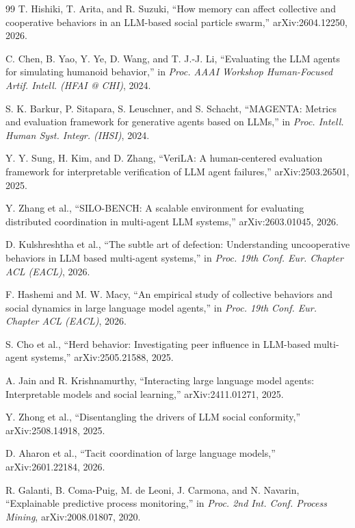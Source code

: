 \documentclass[11pt]{article}
\begin{document}
\begin{thebibliography}{99}
T. Hishiki, T. Arita, and R. Suzuki, ``How memory can affect collective and cooperative behaviors in an LLM-based social particle swarm,'' arXiv:2604.12250, 2026.

C. Chen, B. Yao, Y. Ye, D. Wang, and T. J.-J. Li, ``Evaluating the LLM agents for simulating humanoid behavior,'' in \emph{Proc. AAAI Workshop Human-Focused Artif. Intell. (HFAI @ CHI)}, 2024.

S. K. Barkur, P. Sitapara, S. Leuschner, and S. Schacht, ``MAGENTA: Metrics and evaluation framework for generative agents based on LLMs,'' in \emph{Proc. Intell. Human Syst. Integr. (IHSI)}, 2024.

Y. Y. Sung, H. Kim, and D. Zhang, ``VeriLA: A human-centered evaluation framework for interpretable verification of LLM agent failures,'' arXiv:2503.26501, 2025.

Y. Zhang et al., ``SILO-BENCH: A scalable environment for evaluating distributed coordination in multi-agent LLM systems,'' arXiv:2603.01045, 2026.

D. Kulshreshtha et al., ``The subtle art of defection: Understanding uncooperative behaviors in LLM based multi-agent systems,'' in \emph{Proc. 19th Conf. Eur. Chapter ACL (EACL)}, 2026.

F. Hashemi and M. W. Macy, ``An empirical study of collective behaviors and social dynamics in large language model agents,'' in \emph{Proc. 19th Conf. Eur. Chapter ACL (EACL)}, 2026.

S. Cho et al., ``Herd behavior: Investigating peer influence in LLM-based multi-agent systems,'' arXiv:2505.21588, 2025.

A. Jain and R. Krishnamurthy, ``Interacting large language model agents: Interpretable models and social learning,'' arXiv:2411.01271, 2025.

Y. Zhong et al., ``Disentangling the drivers of LLM social conformity,'' arXiv:2508.14918, 2025.

D. Aharon et al., ``Tacit coordination of large language models,'' arXiv:2601.22184, 2026.

R. Galanti, B. Coma-Puig, M. de Leoni, J. Carmona, and N. Navarin, ``Explainable predictive process monitoring,'' in \emph{Proc. 2nd Int. Conf. Process Mining}, arXiv:2008.01807, 2020.


\end{thebibliography}
\end{document}
